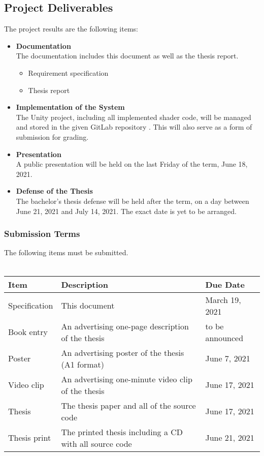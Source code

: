 \subsection{Project Deliverables}
The project results are the following items:
\begin{itemize}
    \item \textbf{Documentation} \\
    The documentation includes this document as well as the thesis report.
    \begin{itemize}
        \item Requirement specification
        \item Thesis report
    \end{itemize}
    \item \textbf{Implementation of the System} \\
    The Unity project, including all implemented shader code, will be managed and stored in the given GitLab repository \cite{gitlab}. This will also serve as a form of submission for grading.
    \item \textbf{Presentation} \\
    A public presentation will be held on the last Friday of the term, June 18, 2021.
    \item \textbf{Defense of the Thesis} \\
    The bachelor's thesis defense will be held after the term, on a day between June 21, 2021 and July 14, 2021. The exact date is yet to be arranged. 
\end{itemize}

\subsubsection{Submission Terms}
The following items must be submitted.
\\\\
\noindent
\begin{tabular}{|l|l|l|}
    \hline
    \textbf{Item}    & \textbf{Description}                                      & \textbf{Due Date}     \\ \hline
    Specification    & This document                                             & March 19, 2021      \\ \hline
    Book entry       & An advertising one-page description of the thesis         & to be announced       \\ \hline
    Poster           & An advertising poster of the thesis (A1 format)           & June 7, 2021        \\ \hline
    Video clip       & An advertising one-minute video clip of the thesis        & June 17, 2021       \\ \hline
    Thesis           & The thesis paper and all of the source code               & June 17, 2021       \\ \hline
    Thesis print     & The printed thesis including a CD with all source code    & June 21, 2021       \\ \hline
\end{tabular}
\newline
\noindent